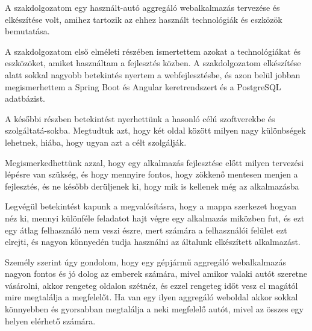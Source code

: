 
A szakdolgozatom egy használt-autó aggregáló webalkalmazás tervezése és elkészítése volt, amihez tartozik az ehhez használt technológiák és eszközök bemutatása.

A szakdolgozatom első elméleti részében ismertettem azokat a technológiákat és eszközöket, amiket használtam a fejlesztés közben. A szakdolgozatom elkészítése alatt sokkal nagyobb betekintés nyertem a webfejlesztésbe, és azon belül jobban megismerhettem a Spring Boot és Angular keretrendszert és a PostgreSQL adatbázist.

A későbbi részben betekintést nyerhettünk a hasonló célú szoftverekbe és szolgáltatá-sokba. Megtudtuk azt, hogy két oldal között milyen nagy különbségek lehetnek, hiába, hogy ugyan azt a célt szolgálják.

Megismerkedhettünk azzal, hogy egy alkalmazás fejlesztése előtt milyen tervezési lépésre van szükség, és hogy mennyire fontos, hogy zökkenő mentesen menjen a fejlesztés, és ne később derüljenek ki, hogy mik is kellenek még az alkalmazásba

Legvégül betekintést kapunk a megvalósításra, hogy a mappa szerkezet hogyan néz ki, mennyi különféle feladatot hajt végre egy alkalmazás miközben fut, és ezt egy átlag felhasználó nem veszi észre, mert számára a felhasználói felület ezt elrejti, és nagyon könnyedén tudja használni az általunk elkészített alkalmazást.

Személy szerint úgy gondolom, hogy egy gépjármű aggregáló webalkalmazás nagyon fontos és jó dolog az emberek számára, mivel amikor valaki autót szeretne vásárolni, akkor rengeteg oldalon szétnéz, és ezzel rengeteg időt vesz el magától mire megtalálja a megfelelőt. Ha van egy ilyen aggregáló weboldal akkor sokkal könnyebben és gyorsabban megtalálja a neki megfelelő autót, mivel az összes egy helyen elérhető számára. 
